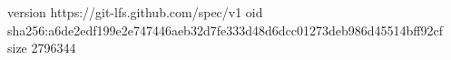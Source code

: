 version https://git-lfs.github.com/spec/v1
oid sha256:a6de2edf199e2e747446aeb32d7fe333d48d6dcc01273deb986d45514bff92cf
size 2796344
